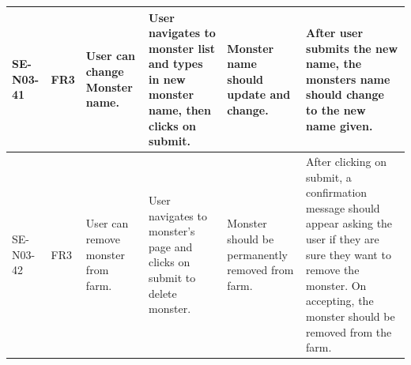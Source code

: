 \documentclass[a4paper]{article}
\begin{document}
\begin{landscape}
\begin{center}
\begin{tabular}{| l | l | p{3cm} | p{3cm} | p{5cm} | p{7cm} |}
	\hline
	SE-N03-41 & FR3 & User can change Monster name. & User navigates to monster list and types in new monster name, then clicks on submit. & Monster name should update and change. & After user submits the new name, the monsters name should change to the new name given.\\
	\hline
SE-N03-42 & FR3 & User can remove monster from farm. & User navigates to monster's page and clicks on submit to delete monster. & Monster should be permanently removed from farm. & After clicking on submit, a confirmation message should appear asking the user if they are sure they want to remove the monster. On accepting, the monster should be removed from the farm.\\
	\hline
	
\end{tabular}
\end{center}
\clearpage


\end{landscape}
\end{document}
